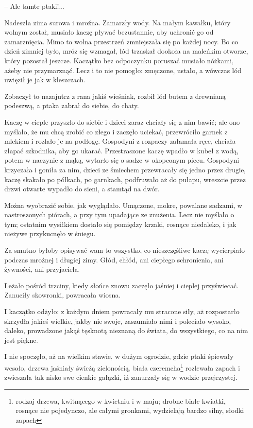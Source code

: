 \documentclass{book}
\begin{document}
-- Ale tamte ptaki!...

Nadeszła zima surowa i mroźna. Zamarzły wody. Na małym kawałku, który wolnym został, musiało kaczę pływać bezustannie, aby uchronić go od zamarznięcia. Mimo to wolna przestrzeń zmniejszała się po każdej nocy. Bo co dzień zimniej było, mróz się wzmagał, lód trzaskał dookoła na maleńkim otworze, który pozostał jeszcze. Kaczątko bez odpoczynku poruszać musiało nóżkami, ażeby nie  przymarznąć. Lecz i to nie pomogło: zmęczone, ustało, a wówczas lód uwięził je jak w kleszczach.

Zobaczył to nazajutrz z rana jakiś wieśniak, rozbił lód butem z drewnianą podeszwą, a ptaka zabrał do siebie, do chaty.

Kaczę w cieple przyszło do siebie i dzieci zaraz chciały się z nim bawić; ale ono myślało, że mu chcą zrobić co złego i zaczęło uciekać, przewróciło garnek z mlekiem i rozlało je na podłogę. Gospodyni z rozpaczy załamała ręce, chciała złapać szkodnika, aby go ukarać. Przestraszone kaczę wpadło w kubeł z wodą, potem w naczynie z mąką, wytarło się o sadze w okopconym piecu. Gospodyni krzyczała i goniła za nim, dzieci ze śmiechem przewracały się jedno przez drugie, kaczę skakało po półkach, po garnkach, podfruwało aż do pułapu, wreszcie przez drzwi otwarte wypadło do sieni, a stamtąd na dwór.

Można wyobrazić sobie, jak wyglądało. Umączone, mokre, powalane sadzami, w nastroszonych piórach, a przy tym upadające ze znużenia. Lecz nie myślało o tym; ostatnim wysiłkiem dostało się pomiędzy krzaki, rosnące niedaleko, i jak nieżywe przykucnęło w śniegu.

Za smutno byłoby opisywać wam to wszystko, co nieszczęśliwe kaczę wycierpiało podczas mroźnej i długiej zimy. Głód, chłód, ani ciepłego schronienia, ani żywności, ani przyjaciela.

Leżało pośród trzciny, kiedy słońce znowu zaczęło jaśniej i cieplej przyświecać. Zanuciły skowronki, powracała wiosna.

I kaczątko odżyło: z każdym dniem powracały mu stracone siły, aż rozpostarło skrzydła jakieś wielkie, jakby nie swoje, zaszumiało nimi i poleciało wysoko, daleko, prowadzone jakąś tęsknotą nieznaną do świata, do wszystkiego, co na nim jest piękne.

I nie spoczęło, aż na wielkim stawie, w dużym ogrodzie, gdzie ptaki śpiewały wesoło, drzewa jaśniały świeżą zielonością, biała  czeremcha\footnote{rodzaj drzewa, kwitnącego w kwietniu i w maju; drobne białe kwiatki, rosnące nie pojedynczo, ale całymi gronkami, wydzielają bardzo silny, słodki zapach} rozlewała zapach i zwieszała tak nisko swe cienkie gałązki, iż zanurzały się w wodzie przejrzystej.
\end{document}
